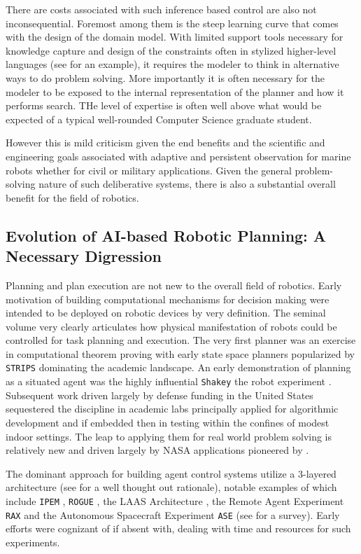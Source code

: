 There are costs associated with such inference based control are also
not inconsequential. Foremost among them is the steep learning curve
that comes with the design of the domain model. With limited support
tools necessary for knowledge capture and design of the constraints
often in stylized higher-level languages (see \cite{NDDL} for an
example), it requires the modeler to think in alternative ways to do
problem solving. More importantly it is often necessary for the
modeler to be exposed to the internal representation of the planner
and how it performs search. THe level of expertise is often well above
what would be expected of a typical well-rounded Computer Science
graduate student.

However this is mild criticism given the end benefits and the
scientific and engineering goals associated with adaptive and
persistent observation for marine robots whether for civil or military
applications. Given the general problem-solving nature of such
deliberative systems, there is also a substantial overall benefit for
the field of robotics.

\subsection{Evolution of AI-based Robotic Planning: A Necessary Digression}

Planning and plan execution are not new to the overall field of
robotics. Early motivation of building computational mechanisms for
decision making were intended to be deployed on robotic devices by
very definition. The seminal volume \cite{computersthought} very
clearly articulates how physical manifestation of robots could be
controlled for task planning and execution. The very first planner
\cite{green69} was an exercise in computational theorem proving with
early state space planners popularized by \texttt{STRIPS}
\cite{strips71} dominating the academic landscape. An early
demonstration of planning as a situated agent was the highly
influential \texttt{Shakey} the robot experiment
\cite{shakey84}. Subsequent work driven largely by defense funding in
the United States sequestered the discipline in academic labs
principally applied for algorithmic development and if embedded then
in testing within the confines of modest indoor settings. The leap to
applying them for real world problem solving is relatively new and
driven largely by NASA applications pioneered by \cite{mus94,mus98,
  jonsson00, rajan00, chien05, bresina05}.

The dominant approach for building agent control systems utilize a
$3$-layered architecture (see \cite{gat98} for a well thought out
rationale), notable examples of which include \texttt{IPEM}
\cite{AmbrosIngerson88}, \texttt{ROGUE} \cite{Haigh98}, the LAAS
Architecture \cite{alami:1998p820}, the Remote Agent Experiment
\texttt{RAX} \cite{mus98} and the Autonomous Spacecraft Experiment
\texttt{ASE} \cite{chien99} (see \cite{Knight01} for a survey). Early
efforts were cognizant of if absent with, dealing with time and
resources for such experiments.

